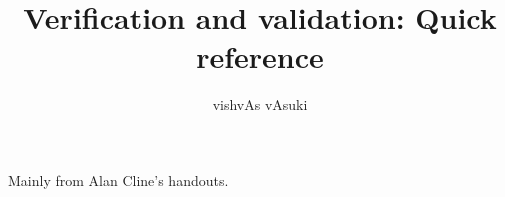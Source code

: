 \documentclass{article}
\title{Verification and validation: Quick reference}
\author{vishvAs vAsuki}
\begin{document}
\maketitle

Mainly from Alan Cline's handouts.


% 
% 
\end{document}
